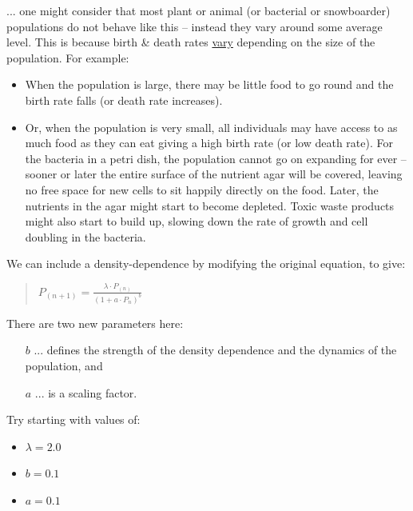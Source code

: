\documentclass{tufte-book} %
\newenvironment{docspec}{\begin{quotation}\ttfamily\parskip0pt\parindent0pt\ignorespaces}{\end{quotation}}
\begin{document}
\vspace{-2mm}
 ... one might consider that most plant or animal (or bacterial or snowboarder) populations do not behave like this -- instead they vary around some average level. This is because birth \& death rates \uline{vary} depending on the size of the population. For example:

\begin{itemize}[noitemsep]
\setlength{\itemindent}{.2in}
\item When the population is large, there may be little food to go round and the birth rate falls (or death rate increases).
\item Or, when the population is very small, all individuals may have access to as much food as they can eat giving a high birth rate (or low death rate).
For the bacteria in a petri dish, the population cannot go on expanding for ever -- sooner or later the entire surface of the nutrient agar will be covered, leaving no free space for new cells to sit happily directly on the food. Later, the nutrients in the agar might start to become depleted. Toxic waste products might also start to build up, slowing down the rate of growth and cell doubling in the bacteria. 
\end{itemize}

We can include a density-dependence by modifying the original equation, to give:

\begin{docspec}
\large
\(P_{(n+1)} = \frac{\lambda\cdot P_{(n)}}{(1 + a\cdot P_{n})^{b}}\)
\normalsize
\end{docspec}

There are two new parameters here:

\begin{enumerate}[noitemsep]
\setlength{\itemindent}{.2in}
\item[\(b\)] ... defines the strength of the density dependence and the dynamics of the population, and
\item[\(a\)] ... is a scaling factor.
\end{enumerate}

Try starting with values of:

\begin{itemize}[noitemsep]
\setlength{\itemindent}{.2in}
\item \(\lambda=2.0\)
\item \(b=0.1\)
\item \(a=0.1\)
\end{itemize}
\end{document}
